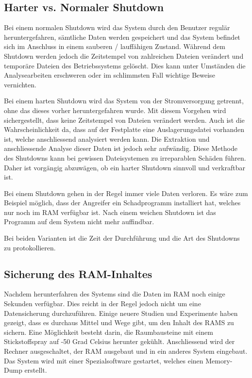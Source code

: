 \subsection{Harter vs. Normaler Shutdown}
Bei einem normalen Shutdown wird das System durch den Benutzer regulär heruntergefahren, sämtliche Daten werden gespeichert und das System befindet sich im Anschluss in einem sauberen / lauffähigen Zustand. Während dem Shutdown werden jedoch die Zeitstempel von zahlreichen Dateien verändert und temporäre Dateien des Betriebssystems gelöscht. Dies kann unter Umständen die Analysearbeiten erschweren oder im schlimmsten Fall wichtige Beweise vernichten. 

Bei einem harten Shutdown wird das System von der Stromversorgung getrennt, ohne das dieses vorher heruntergefahren wurde. Mit diesem Vorgehen wird sichergestellt, dass keine Zeitstempel von Dateien verändert werden. Auch ist die Wahrscheinlichkeit da, dass auf der Festplatte eine Auslagerungsdatei vorhanden ist, welche anschliessend analysiert werden kann. Die Extraktion und anschliessende Analyse dieser Daten ist jedoch sehr aufwändig. Diese Methode des Shutdowns kann bei gewissen Dateisystemen zu irreparablen Schäden führen. Daher ist vorgängig abzuwägen, ob ein harter Shutdown sinnvoll und verkraftbar ist.

Bei einem Shutdown gehen in der Regel immer viele Daten verloren. Es wäre zum Beispiel möglich, dass der Angreifer ein Schadprogramm installiert hat, welches nur noch im RAM verfügbar ist. Nach einem weichen Shutdown ist das Programm auf dem System nicht mehr auffindbar. 

Bei beiden Varianten ist die Zeit der Durchführung und die Art des Shutdowns zu protokollieren.

\subsection{Sicherung des RAM-Inhaltes}
Nachdem herunterfahren des Systems sind die Daten im RAM noch einige Sekunden verfügbar. Dies reicht in der Regel jedoch nicht um eine Datensicherung durchzuführen. Einige neuere Studien und Experimente haben gezeigt, dass es durchaus Mittel und Wege gibt, um den Inhalt des RAMS zu sichern. Eine Möglichkeit besteht darin, die Raumbausteine mit einem Stickstoffspray auf -50 Grad Celsius herunter gekühlt. Anschliessend wird der Rechner ausgeschaltet, der RAM ausgebaut und in ein anderes System eingebaut. Das System wird mit einer Spezialsoftware gestartet, welches einen Memory-Dump erstellt.

